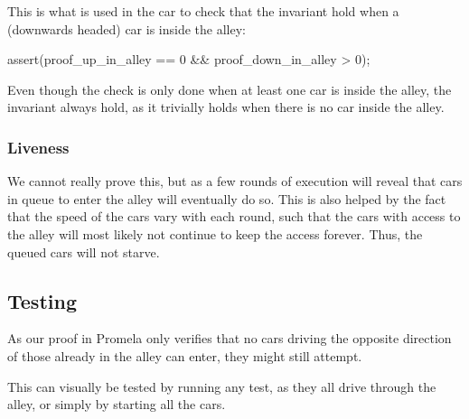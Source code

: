This is what is used in the car  to check that the invariant hold when a (downwards headed) car is inside the alley:
\begin{promela}
assert(proof_up_in_alley == 0 && proof_down_in_alley > 0);
\end{promela}



Even though the check is only done when at least one car is inside the alley, the invariant always hold, as it trivially holds when there is no car inside the alley.


\subsubsection{Liveness}
We cannot really prove this, but as a few rounds of execution will reveal that cars in queue to enter the alley will eventually do so. This is also helped by the fact that the speed of the cars vary with each round, such that the cars with access to the alley will most likely not continue to keep the access forever. Thus, the queued cars will not starve.


\subsection{Testing}
\label{sub:all-test}
As our proof in Promela only verifies that no cars driving the
opposite direction of those already in the alley can enter, they might
still attempt.

This can visually be tested by running any test, as they all drive through
the alley, or simply by starting all the cars.
